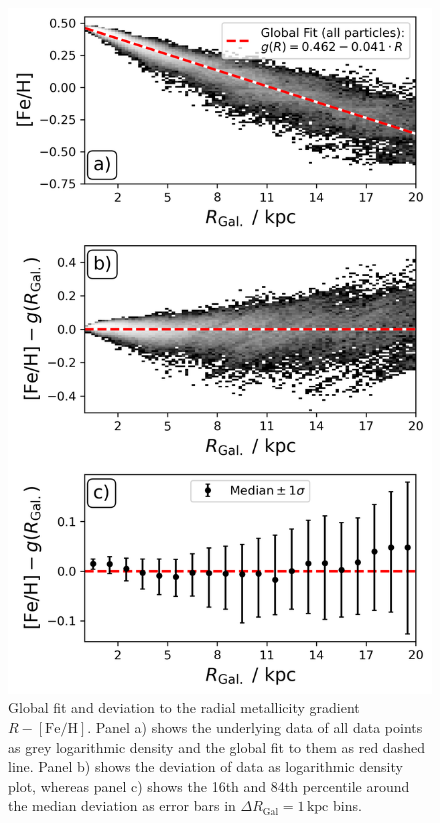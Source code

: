 \documentclass[fleqn,usenatbib]{mnras}
\begin{document}
\begin{figure}
    \centering
    \includegraphics[width=\columnwidth]{figures/global_r_feh_fit.png}
    \caption{Global fit and deviation to the radial metallicity gradient $R-\mathrm{[Fe/H]}$. Panel a) shows the underlying data of all data points as grey logarithmic density and the global fit to them as red dashed line. Panel b) shows the deviation of data as logarithmic density plot, whereas panel c) shows the 16th and 84th percentile around the median deviation as error bars in $\Delta R_\mathrm{Gal} = 1\,\mathrm{kpc}$ bins.}
    \label{fig:global_r_feh_fit}
\end{figure}
\end{document}
